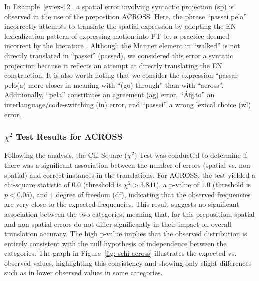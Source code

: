 In Example~\ref{ex:ex-12}, a spatial error involving syntactic projection (sp) is observed in the use of the preposition ACROSS. Here, the phrase ``passei pela'' incorrectly attempts to translate the spatial expression by adopting the EN lexicalization pattern of expressing motion into PT-br, a practice deemed incorrect by the literature \parencite{talmy2000towardb, slobin2005relating, McCleary-Viotti-2004}. Although the Manner element in ``walked'' is not directly translated in ``passei'' (passed), we considered this error a syntatic projection because it reflects an attempt at directly translating the EN construction. It is also worth noting that we consider the expression ``passar pelo(a) more closer in meaning with ``(go) through'' than with ``across''. Additionally, ``pela'' constitutes an agreement (ag) error, ``Áfgão'' an interlanguage/code-switching (in) error, and ``passei'' a wrong lexical choice (wl) error.


\subsubsection{$\chi^2$ Test Results for ACROSS} 

Following the analysis, the Chi-Square ($\chi^2$) Test was conducted to determine if there was a significant association between the number of errors (spatial vs. non-spatial) and correct instances in the translations. For ACROSS, the test yielded a chi-square statistic of $0.0$ (threshold is  $\chi^2 > 3.841$), a p-value of $1.0$ (threshold is  $p < 0.05$), and $1$ degree of freedom (df), indicating that the observed frequencies are very close to the expected frequencies. This result suggests no significant association between the two categories, meaning that, for this preposition, spatial and non-spatial errors do not differ significantly in their impact on overall translation accuracy. The high p-value implies that the observed distribution is entirely consistent with the null hypothesis of independence between the categories. The graph in Figure~\ref{fig: schi-across} illustrates the expected vs. observed values, highlighting this consistency and showing only slight differences such as in lower observed values in some categories.

